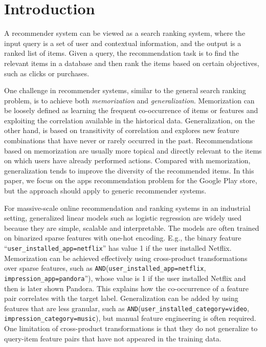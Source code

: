 \documentclass{sig-alternate-05-2015}
\begin{document}

\printccsdesc


\section{Introduction}
A recommender system can be viewed as a search ranking system, where the input query is a set of user and contextual information, and the output is a ranked list of items. Given a query, the recommendation task is to find the relevant items in a database and then rank the items based on certain objectives, such as clicks or purchases.

One challenge in recommender systems, similar to the general search ranking problem, is to achieve both \textit{memorization} and \textit{generalization}.
Memorization can be loosely defined as learning the frequent co-occurrence of items or features and exploiting the correlation available in the historical data. Generalization, on the other hand, is based on transitivity of correlation and explores new feature combinations that have never or rarely occurred in the past.
Recommendations based on memorization are usually more topical and directly relevant to the items on which users have already performed actions.
Compared with memorization, generalization tends to improve the diversity of the recommended items. In this paper, we focus on the apps recommendation problem for the Google Play store, but the approach should apply to generic recommender systems.

For massive-scale online recommendation and ranking systems in an industrial setting, generalized linear models such as logistic regression are widely used because they are simple, scalable and interpretable. The models are often trained on binarized sparse features with one-hot encoding. E.g., the binary feature ``\texttt{user\_installed\_app=netflix}'' has value 1 if the user installed Netflix. Memorization can be achieved effectively using cross-product transformations over sparse features, such as  \texttt{AND}(\texttt{user\_installed\_app=netflix}, \texttt{impression\_app=pandora}''), whose value is 1 if the user installed Netflix and then is later shown Pandora. This explains how the co-occurrence of a feature pair correlates with the target label. Generalization can be added by using features that are less granular, such as \texttt{AND}(\texttt{user\_installed\_category=video}, \texttt{impression\_category=music}), but manual feature engineering is often required. One limitation of cross-product transformations is that they do not generalize to query-item feature pairs that have not appeared in the training data.
\end{document}
